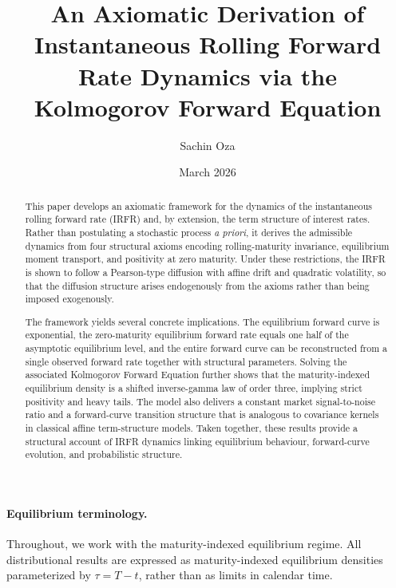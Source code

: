 \documentclass[12pt]{article}
\title{An Axiomatic Derivation of Instantaneous Rolling Forward Rate Dynamics via the Kolmogorov Forward Equation}
\author{Sachin Oza}
\date{March 2026}
\theoremstyle{statementstyle}
\begin{document}
\maketitle
\vspace{-1.0em}

\begin{abstract}
This paper develops an axiomatic framework for the dynamics of the instantaneous rolling forward rate (IRFR) and, by extension, the term structure of interest rates. Rather than postulating a stochastic process \emph{a priori}, it derives the admissible dynamics from four structural axioms encoding rolling-maturity invariance, equilibrium moment transport, and positivity at zero maturity. Under these restrictions, the IRFR is shown to follow a Pearson-type diffusion with affine drift and quadratic volatility, so that the diffusion structure arises endogenously from the axioms rather than being imposed exogenously.

The framework yields several concrete implications. The equilibrium forward curve is exponential, the zero-maturity equilibrium forward rate equals one half of the asymptotic equilibrium level, and the entire forward curve can be reconstructed from a single observed forward rate together with structural parameters. Solving the associated Kolmogorov Forward Equation further shows that the maturity-indexed equilibrium density is a shifted inverse-gamma law of order three, implying strict positivity and heavy tails. The model also delivers a constant market signal-to-noise ratio and a forward-curve transition structure that is analogous to covariance kernels in classical affine term-structure models. Taken together, these results provide a structural account of IRFR dynamics linking equilibrium behaviour, forward-curve evolution, and probabilistic structure.
\end{abstract}


\paragraph{Equilibrium terminology.}
Throughout, we work with the maturity-indexed equilibrium regime. All distributional results are expressed as maturity-indexed equilibrium densities parameterized by $\tau = T-t$, rather than as limits in calendar time.
\end{document}

